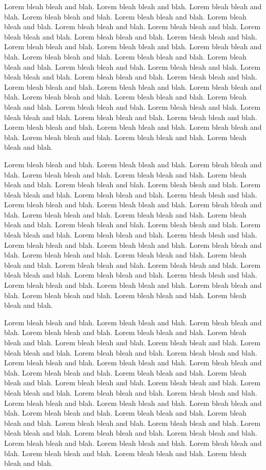 \documentclass[letterpaper,10pt]{article}
\begin{document}
Lorem bleah bleah and blah. Lorem bleah bleah and blah. Lorem bleah
bleah and blah. Lorem bleah bleah and blah. Lorem bleah bleah and
blah. Lorem bleah bleah and blah. Lorem bleah bleah and blah. Lorem
bleah bleah and blah. Lorem bleah bleah and blah. Lorem bleah bleah
and blah. Lorem bleah bleah and blah. Lorem bleah bleah and blah.
Lorem bleah bleah and blah. Lorem bleah bleah and blah. Lorem bleah
bleah and blah. Lorem bleah bleah and blah. Lorem bleah bleah and
blah. Lorem bleah bleah and blah. Lorem bleah bleah and blah. Lorem
bleah bleah and blah. Lorem bleah bleah and blah. Lorem bleah bleah
and blah. Lorem bleah bleah and blah. Lorem bleah bleah and blah.
Lorem bleah bleah and blah. Lorem bleah bleah and blah. Lorem bleah
bleah and blah. Lorem bleah bleah and blah. Lorem bleah bleah and
blah. Lorem bleah bleah and blah. Lorem bleah bleah and blah. Lorem
bleah bleah and blah. Lorem bleah bleah and blah. Lorem bleah bleah
and blah. Lorem bleah bleah and blah. Lorem bleah bleah and blah.
Lorem bleah bleah and blah. Lorem bleah bleah and blah. Lorem bleah
bleah and blah.

Lorem bleah bleah and blah. Lorem bleah bleah and blah. Lorem bleah
bleah and blah. Lorem bleah bleah and blah. Lorem bleah bleah and
blah. Lorem bleah bleah and blah. Lorem bleah bleah and blah. Lorem
bleah bleah and blah. Lorem bleah bleah and blah. Lorem bleah bleah
and blah. Lorem bleah bleah and blah. Lorem bleah bleah and blah.
Lorem bleah bleah and blah. Lorem bleah bleah and blah. Lorem bleah
bleah and blah. Lorem bleah bleah and blah. Lorem bleah bleah and
blah. Lorem bleah bleah and blah. Lorem bleah bleah and blah. Lorem
bleah bleah and blah. Lorem bleah bleah and blah. Lorem bleah bleah
and blah. Lorem bleah bleah and blah. Lorem bleah bleah and blah.
Lorem bleah bleah and blah. Lorem bleah bleah and blah. Lorem bleah
bleah and blah. Lorem bleah bleah and blah. Lorem bleah bleah and
blah. Lorem bleah bleah and blah. Lorem bleah bleah and blah. Lorem
bleah bleah and blah. Lorem bleah bleah and blah. Lorem bleah bleah
and blah. Lorem bleah bleah and blah. Lorem bleah bleah and blah.
Lorem bleah bleah and blah. Lorem bleah bleah and blah. Lorem bleah
bleah and blah.

Lorem bleah bleah and blah. Lorem bleah bleah and blah. Lorem bleah
bleah and blah. Lorem bleah bleah and blah. Lorem bleah bleah and
blah. Lorem bleah bleah and blah. Lorem bleah bleah and blah. Lorem
bleah bleah and blah. Lorem bleah bleah and blah. Lorem bleah bleah
and blah. Lorem bleah bleah and blah. Lorem bleah bleah and blah.
Lorem bleah bleah and blah. Lorem bleah bleah and blah. Lorem bleah
bleah and blah. Lorem bleah bleah and blah. Lorem bleah bleah and
blah. Lorem bleah bleah and blah. Lorem bleah bleah and blah. Lorem
bleah bleah and blah. Lorem bleah bleah and blah. Lorem bleah bleah
and blah. Lorem bleah bleah and blah. Lorem bleah bleah and blah.
Lorem bleah bleah and blah. Lorem bleah bleah and blah. Lorem bleah
bleah and blah. Lorem bleah bleah and blah. Lorem bleah bleah and
blah. Lorem bleah bleah and blah. Lorem bleah bleah and blah. Lorem
bleah bleah and blah. Lorem bleah bleah and blah. Lorem bleah bleah
and blah. Lorem bleah bleah and blah. Lorem bleah bleah and blah.
Lorem bleah bleah and blah. Lorem bleah bleah and blah. Lorem bleah
bleah and blah.
\end{document}
